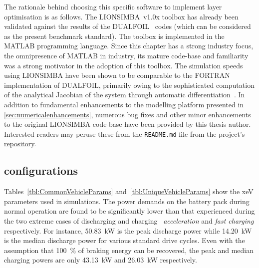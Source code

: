 The  rationale  behind  choosing  this  specific  software  to  implement  layer
optimisation  is  as  follows.  The LIONSIMBA~v1.0x  toolbox  has  already  been
validated against  the results of the  DUALFOIL~\cite{Dualfoil1998} codes (which
can be considered as the present benchmark standard). The toolbox is implemented
in the  MATLAB programming language.  Since this  chapter has a  strong industry
focus,  the  omnipresence  of  MATLAB  in industry,  its  mature  code-base  and
familiarity  was  a strong  motivator  in  the  adoption  of this  toolbox.  The
simulation  speeds using  LIONSIMBA  have been  shown to  be  comparable to  the
FORTRAN  implementation  of  DUALFOIL,  primarily  owing  to  the  sophisticated
computation  of  the  analytical  Jacobian   of  the  system  through  automatic
differentiation~\cite{Torchio2016}.  In  addition  to  fundamental  enhancements
to  the   modelling  platform  presented   in  \cref{sec:numericalenhancements},
numerous  bug fixes  and  other  minor enhancements  to  the original  LIONSIMBA
code-base  have  been  provided  by   this  thesis  author.  Interested  readers
may  peruse   these  from  the   \texttt{README.md}  file  from   the  project's
\href{https://github.com/lionsimbatoolbox/LIONSIMBA}{repository}.

\subsection{ configurations}



Tables~\ref{tbl:CommonVehicleParams} and~\ref{tbl:UniqueVehicleParams}  show the
\gls{xeV}  parameters used  in simulations.  The  power demands  on the  battery
pack  during  normal  operation  are   found  to  be  significantly  lower  than
that  experienced during  the  two  extreme cases  of  discharging and  charging
\viz~\emph{acceleration} and \emph{fast  charging} respectively. For instance,
\SI{50.83}{\kilo\watt} is the peak  discharge power while \SI{14.20}{\kilo\watt}
is  the median  discharge power  for various  standard drive  cycles. Even  with
the  assumption that  \SI{100}{\percent}  of braking  energy  can be  recovered,
the  peak  and  median  charging  powers  are  only  \SI{43.13}{\kilo\watt}  and
\SI{26.03}{\kilo\watt}  respectively.

